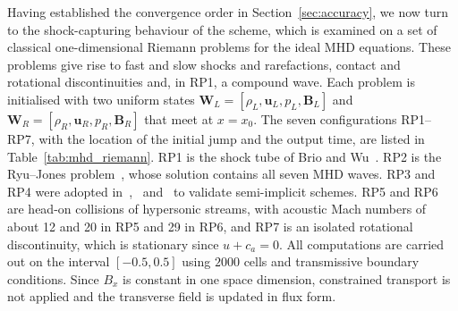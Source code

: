 \documentclass[a4paper,fleqn]{cas-sc}
\theoremstyle{remark}
\begin{document}
Having established the convergence order in Section~\ref{sec:accuracy}, we
now turn to the shock-capturing behaviour of the scheme, which is examined on a
set of classical one-dimensional Riemann problems for the ideal MHD equations.
These problems give rise to fast and slow shocks and rarefactions, contact and
rotational discontinuities and, in RP1, a compound wave. Each problem is
initialised with two uniform
states $\mathbf{W}_L=[\rho_L,\mathbf{u}_L,p_L,\mathbf{B}_L]$ and
$\mathbf{W}_R=[\rho_R,\mathbf{u}_R,p_R,\mathbf{B}_R]$ that meet at $x=x_0$.
The seven configurations RP1--RP7, with the location of the initial jump and the
output time, are listed in Table~\ref{tab:mhd_riemann}. RP1 is the shock tube
of Brio and Wu~\cite{BrioWu1988}. RP2 is the Ryu--Jones
problem~\cite{RyuJones1995}, whose solution contains all seven MHD waves. RP3
and RP4 were adopted in~\cite{Dumbser2019},~\cite{Fambri2021} and~\cite{Dematte2024} to
validate semi-implicit schemes. RP5 and RP6 are head-on collisions of
hypersonic streams, with acoustic Mach numbers of about 12 and 20 in RP5 and
29 in RP6, and RP7 is an isolated rotational discontinuity, which is
stationary since $u+c_a=0$. %
All computations are carried out on the
interval $[-0.5,0.5]$ using $2000$ cells and transmissive boundary conditions.
Since $B_x$ is constant in one space dimension, constrained transport is not
applied and the transverse field is updated in flux form.
\end{document}
